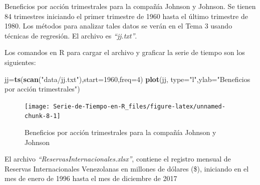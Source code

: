 \documentclass[12pt,]{krantz}
\makeatletter
\newenvironment{Shaded}{\begin{snugshade}}{\end{snugshade}}
\newcommand{\KeywordTok}[1]{\textcolor[rgb]{0.13,0.29,0.53}{\textbf{#1}}}
\newcommand{\DataTypeTok}[1]{\textcolor[rgb]{0.13,0.29,0.53}{#1}}
\newcommand{\DecValTok}[1]{\textcolor[rgb]{0.00,0.00,0.81}{#1}}
\newcommand{\StringTok}[1]{\textcolor[rgb]{0.31,0.60,0.02}{#1}}
\newcommand{\NormalTok}[1]{#1}
\newenvironment{kframe}{%
\medskip{}
\setlength{\fboxsep}{.8em}
 \def\at@end@of@kframe{}%
 \ifinner\ifhmode%
  \def\at@end@of@kframe{\end{minipage}}%
  \begin{minipage}{\columnwidth}%
 \fi\fi%
 \def\FrameCommand##1{\hskip\@totalleftmargin \hskip-\fboxsep
 \colorbox{shadecolor}{##1}\hskip-\fboxsep
     \hskip-\linewidth \hskip-\@totalleftmargin \hskip\columnwidth}%
 \MakeFramed {\advance\hsize-\width
   \@totalleftmargin\z@ \linewidth\hsize
   \@setminipage}}%
 {\par\unskip\endMakeFramed%
 \at@end@of@kframe}
\renewenvironment{Shaded}{\begin{kframe}}{\end{kframe}}
\theoremstyle{definition}
\theoremstyle{definition}
\theoremstyle{definition}
\theoremstyle{remark}
\let\BeginKnitrBlock\begin \let\EndKnitrBlock\end
\makeatother
\begin{document}
\BeginKnitrBlock{example}[Beneficios de acciones]
\protect\hypertarget{exm:ejem-beneficios-acciones}{}{\label{exm:ejem-beneficios-acciones}
{} }Beneficios por acción
trimestrales para la compañía Johnson y Johnson. Se tienen 84 trimestres
iniciando el primer trimestre de 1960 hasta el último trimestre de 1980.
Los métodos para analizar tales datos se verán en el Tema 3 usando
técnicas de regresión. El archivo es \emph{``jj.txt''}.

Los comandos en R para cargar el archivo y graficar la serie de tiempo
son los siguientes:
\EndKnitrBlock{example}

\begin{Shaded}
\begin{Highlighting}[]
\NormalTok{jj=}\KeywordTok{ts}\NormalTok{(}\KeywordTok{scan}\NormalTok{(}\StringTok{"data/jj.txt"}\NormalTok{),}\DataTypeTok{start=}\DecValTok{1960}\NormalTok{,}\DataTypeTok{freq=}\DecValTok{4}\NormalTok{) }
\KeywordTok{plot}\NormalTok{(jj, }\DataTypeTok{type=}\StringTok{"l"}\NormalTok{,}\DataTypeTok{ylab=}\StringTok{"Beneficios por acción trimestrales"}\NormalTok{)}
\end{Highlighting}
\end{Shaded}

\begin{figure}

{\centering \texttt{[image: Serie-de-Tiempo-en-R\_files/figure-latex/unnamed-chunk-8-1]} 

}

\caption{Beneficios por acción trimestrales para la compañía Johnson y Johnson}\label{fig:unnamed-chunk-8}
\end{figure}

\BeginKnitrBlock{example}
\protect\hypertarget{exm:reservas-internacionales}{}{\label{exm:reservas-internacionales}
}El archivo \emph{``ReservasInternacionales.xlsx''}, contiene el
registro mensual de Reservas Internacionales Venezolanas en millones de
dólares (\$), iniciando en el mes de enero de 1996 hasta el mes de
diciembre de 2017
\EndKnitrBlock{example}

\begin{Shaded}
\end{Shaded}
\end{document}
